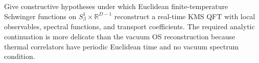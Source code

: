 \begin{openproblem}
\label{op:thermal-real-time-reconstruction}
Give constructive hypotheses under which Euclidean finite-temperature
Schwinger functions on \(S^1_\beta\times\mathbb R^{D-1}\) reconstruct a
real-time KMS QFT with local observables, spectral functions, and transport
coefficients.  The required analytic continuation is more delicate than the
vacuum OS reconstruction because thermal correlators have periodic Euclidean
time and no vacuum spectrum condition.
\end{openproblem}
